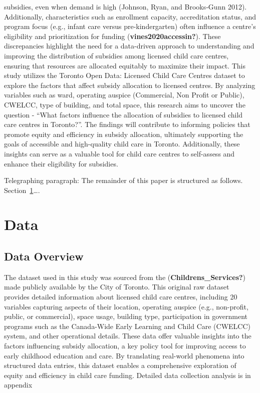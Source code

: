 \documentclass[
  letterpaper,
  DIV=11,
  numbers=noendperiod]{scrartcl}
\begin{document}
subsidies, even when demand is high (Johnson, Ryan, and Brooks‐Gunn
2012). Additionally, characteristics such as enrollment capacity,
accreditation status, and program focus (e.g., infant care versus
pre-kindergarten) often influence a centre's eligibility and
prioritization for funding (\textbf{vines2020accessin?}). These
discrepancies highlight the need for a data-driven approach to
understanding and improving the distribution of subsidies among licensed
child care centres, ensuring that resources are allocated equitably to
maximize their impact. This study utilizes the Toronto Open Data:
Licensed Child Care Centres dataset to explore the factors that affect
subsidy allocation to licensed centres. By analyzing variables such as
ward, operating auspice (Commercial, Non Profit or Public), CWELCC, type
of building, and total space, this research aims to uncover the question
- ``What factors influence the allocation of subsidies to licensed child
care centres in Toronto?''. The findings will contribute to informing
policies that promote equity and efficiency in subsidy allocation,
ultimately supporting the goals of accessible and high-quality child
care in Toronto. Additionally, these insights can serve as a valuable
tool for child care centres to self-assess and enhance their eligibility
for subsidies.

Telegraphing paragraph: The remainder of this paper is structured as
follows. Section~\ref{sec-data}\ldots.

\section{Data}\label{sec-data}

\subsection{Data Overview}\label{data-overview}

The dataset used in this study was sourced from the
(\textbf{Childrens\_Services?}) made publicly available by the City of
Toronto. This original raw dataset provides detailed information about
licensed child care centres, including 20 variables capturing aspects of
their location, operating auspice (e.g., non-profit, public, or
commercial), space usage, building type, participation in government
programs such as the Canada-Wide Early Learning and Child Care (CWELCC)
system, and other operational details. These data offer valuable
insights into the factors influencing subsidy allocation, a key policy
tool for improving access to early childhood education and care. By
translating real-world phenomena into structured data entries, this
dataset enables a comprehensive exploration of equity and efficiency in
child care funding. Detailed data collection analysis is in appendix
\end{document}
